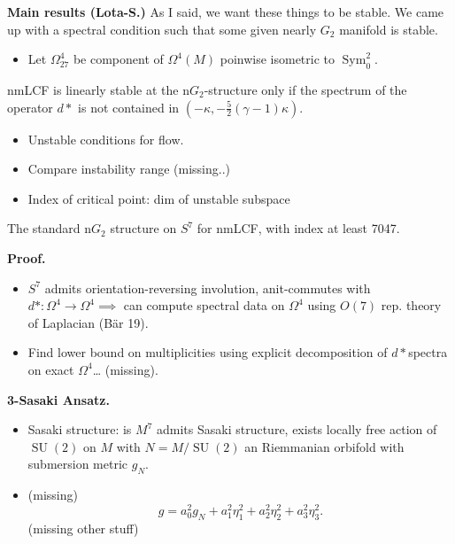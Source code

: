 \medskip\noindent
{\bf Main results (Lota-S.)}
As I said, we want these things to be
stable. We came up with a spectral condition
such that some given nearly $G_2$ manifold
is stable.

\begin{itemize}
\item  Let $\Omega_{27}^4$ be component of
$\Omega^4(M)$ poinwise isometric to
$\operatorname{Sym}^2_0$.
\end{itemize}

\begin{theorem}[Lotay-S]
\label{theorem-lotays}
nmLCF is linearly stable at the
n$G_2$-structure only if the spectrum of the
operator $d *$ is not contained in 
$(-\kappa , -\frac{5}{2} (\gamma -
1)\kappa)$.
\end{theorem}


\begin{itemize}
\item Unstable conditions for flow.
\item Compare instability range (missing..)
\end{itemize}

\begin{itemize}
\item Index of critical point: dim of
unstable subspace
\end{itemize}

\begin{theorem}[Lotay-S]
\label{theorem-lotays2}
The standard n$G_2$ structure on $S^7$ 
for nmLCF, with index at least 7047.
\end{theorem}


\medskip\noindent
{\bf Proof.}
\begin{itemize}
\item $S^7$ admits orientation-reversing
involution, anit-commutes with $d *:
\Omega^4 \to \Omega^4 \implies $ can compute
spectral data on $\Omega^4$ using
$O(7)$ rep. theory of Laplacian (Bär 19).
\item Find lower bound on multiplicities
using explicit decomposition of $d *
$spectra on exact $\Omega^4$… (missing).
\end{itemize}

\medskip\noindent
{\bf 3-Sasaki Ansatz.}
\begin{itemize}
\item Sasaki structure: is $M^7$ admits
Sasaki structure, exists locally free action
of $\operatorname{SU}(2)$ on $M$ with
$N=M/\operatorname{SU}(2)$ an Riemmanian
orbifold with submersion metric $g_N$.
\item (missing)
$$
g=a_0^2g_N + a_1^2
\eta_1^2+a_2^2\eta_2^2+a_3^2\eta_3^2.
$$
(missing other stuff)
\end{itemize}


